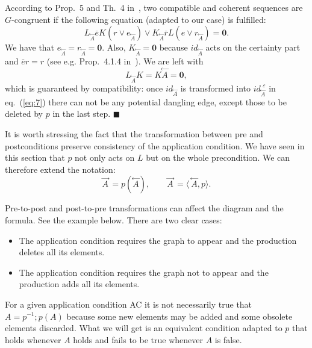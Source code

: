 \documentclass{fundam}
\newcommand{\proofend}{\hfill$\blacksquare$}
\begin{document}
According to Prop.~5 and Th.~4 in~\cite{MGGCombinatorics}, two
compatible and coherent sequences are $G$-congruent if the following
equation (adapted to our case) is fulfilled:
\begin{equation}
  \label{eq:5}
  L_{\stackrel{\leftarrow}{A}} \overline{e} K \left( r \vee
    e_{\stackrel{\leftarrow}{A}} \right) \vee
  K_{\stackrel{\leftarrow}{A}} \overline{r} L (e \vee
  r_{\stackrel{\leftarrow}{A}}) = \mathbf{0}.
\end{equation}
We have that $e_{\stackrel{\leftarrow}{A}} =
r_{\stackrel{\leftarrow}{A}} = \mathbf{0}$. Also,
$K_{\stackrel{\leftarrow}{A}} = \mathbf{0}$ because
$id_{\stackrel{\leftarrow}{A}}$ acts on the certainty part and
$\overline{e}r = r$ (see e.g. Prop.~4.1.4 in~\cite{handbook}). We are
left with
\begin{equation}
  \label{eq:6}
  L_{\stackrel{\leftarrow}{A}} K = K\!\!\stackrel{\leftarrow}{A} =
  \mathbf{0},
\end{equation}
which is guaranteed by compatibility: once
$id_{\stackrel{\leftarrow}{A}}$ is transformed into
$id^{\phantom{i}\varepsilon}_{\stackrel{\leftarrow}{A}}$ in
eq.~(\ref{eq:7}) there can not be any potential dangling edge, except
those to be deleted by $p$ in the last step. \proofend 

It is worth stressing the fact that the transformation between pre and
postconditions preserve consistency of the application condition. We
have seen in this section that $p$ not only acts on $L$ but on the
whole precondition. We can therefore extend the notation:
\begin{equation}\label{eq:prePostTransFuncNotation}
  \stackrel{\rightarrow}{A} \, = p (\stackrel{\leftarrow}{A}), \qquad
  \stackrel{\rightarrow}{A} \, = \langle\ 
    \!\!\stackrel{\leftarrow}{A}, p \rangle.
\end{equation}

Pre-to-post and post-to-pre transformations can affect the diagram and
the formula. See the example below. There are two clear cases:
\begin{itemize}
\item The application condition requires the graph to appear and the
  production deletes all its elements.
\item The application condition requires the graph not to appear and
  the production adds all its elements.
\end{itemize}

For a given application condition AC it is not necessarily true that
$A = p^{-1};p(A)$ because some new elements may be added and some
obsolete elements discarded.  What we will get is an equivalent
condition adapted to $p$ that holds whenever $A$ holds and fails to be
true whenever $A$ is false.
\end{document}
